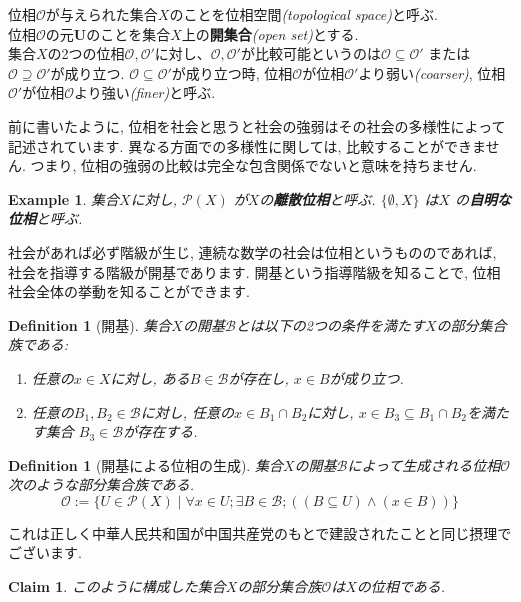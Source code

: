 \documentclass[lualatex]{ltjsbook}
\newtheorem{definition}[theorem]{Definition}
\newtheorem{claim}[theorem]{Claim}
\theoremstyle{remark}
\theoremstyle{plain}
\newtheorem{example}[theorem]{Example}
\begin{document}
位相$\mathcal{O}$が与えられた集合$X$のことを位相空間\textit{(topological space)}と呼ぶ.\\
位相$\mathcal{O}$の元$\mathbf{U}$のことを集合$X$上の\textbf{開集合}\textit{(open set)}とする.\\
集合$X$の2つの位相$\mathcal{O}, \mathcal{O}'$に対し、$\mathcal{O}, \mathcal{O}'$が比較可能というのは$\mathcal{O} \subseteq \mathcal{O}' $ または$ \mathcal{O} \supseteq \mathcal{O}'$が成り立つ.
$\mathcal{O} \subseteq \mathcal{O}'$が成り立つ時,  位相$\mathcal{O}$が位相$\mathcal{O}'$より弱い\textit{(coarser)}, 位相$\mathcal{O}'$が位相$\mathcal{O}$より強い\textit{(finer)}と呼ぶ.

前に書いたように,  位相を社会と思うと社会の強弱はその社会の多様性によって記述されています. 異なる方面での多様性に関しては,  比較することができません. つまり,  位相の強弱の比較は完全な包含関係でないと意味を持ちません.

\begin{example}
	集合$X$に対し,  $\mathcal{P}\left( X \right) $ が$X$の\textbf{離散位相}と呼ぶ. $\{\emptyset ,  X\} $ は$X$ の\textbf{自明な位相}と呼ぶ.
\end{example}

社会があれば必ず階級が生じ,  連続な数学の社会は位相というもののであれば,  社会を指導する階級が開基であります. 開基という指導階級を知ることで,  位相社会全体の挙動を知ることができます.

\begin{definition}[開基]
	集合$X$の開基$\mathcal{B}$とは以下の2つの条件を満たす$X$の部分集合族である:

	\begin{enumerate}
		\item 任意の$x \in X$に対し,  ある$B \in \mathcal{B}$が存在し,  $x \in B$が成り立つ.
		\item 任意の$B_1,  B_2 \in \mathcal{B}$に対し,  任意の$x \in B_1 \cap B_2$に対し,  $x \in B_3 \subseteq B_1 \cap B_2$を満たす集合 $B_3 \in \mathcal{B}$が存在する.
	\end{enumerate}

\end{definition}
\begin{definition}[開基による位相の生成]\label{1}
	集合$X$の開基$\mathcal{B}$によって生成される位相$\mathcal{O}$次のような部分集合族である.
	$$
	\mathcal{O} := \{ U \in \mathcal{P}(X) \mid \forall x \in U ; \exists B \in \mathcal{B} ; \left( \left( B  \subseteq U \right) \land \left(x \in B \right) \right) \}
	$$
\end{definition}
これは正しく中華人民共和国が中国共産党のもとで建設されたことと同じ摂理でございます.
\begin{claim}
	このように構成した集合$X$の部分集合族$\mathcal{O}$は$X$の位相である.
\end{claim}
\end{document}

